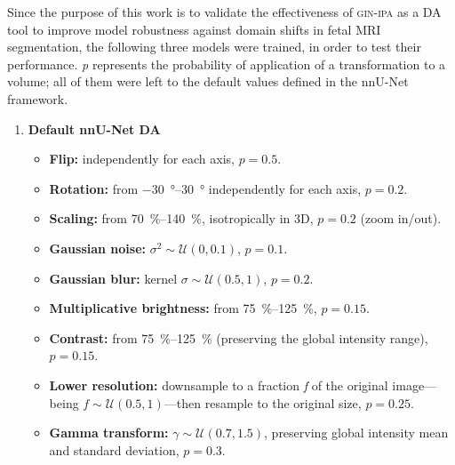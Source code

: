 Since the purpose of this work is to validate the effectiveness of \textsc{gin-ipa} as a DA tool to improve model robustness against domain shifts in fetal MRI segmentation, the following three models were trained, in order to test their performance. \textit{p} represents the probability of application of a transformation to a volume; all of them were left to the default values defined in the nnU-Net framework.
\begin{enumerate}

    \item \textbf{Default nnU-Net DA}
    \begin{itemize}
        \item \textbf{Flip:} independently for each axis, $p=0.5$.
        \item \textbf{Rotation:} from \qtyrange{-30}{30}{\degree} independently for each axis, $p=0.2$.
        \item \textbf{Scaling:} from \qtyrange{70}{140}{\percent}, isotropically in 3D, $p=0.2$ (zoom in/out).
        \item \textbf{Gaussian noise:} $\sigma^2 \sim \mathcal{U}(0, 0.1)$, $p=0.1$.
        \item \textbf{Gaussian blur:} kernel $\sigma \sim \mathcal{U}(0.5, 1)$, $p=0.2$.
        \item \textbf{Multiplicative brightness:} from \qtyrange{75}{125}{\percent}, $p=0.15$.
        \item \textbf{Contrast:} from \qtyrange{75}{125}{\percent} (preserving the global intensity range), $p=0.15$.
        \item \textbf{Lower resolution:} downsample to a fraction \textit{f} of the original image---being $f \sim \mathcal{U}(0.5, 1)$---then resample to the original size, $p=0.25$.
        \item \textbf{Gamma transform:} $\gamma \sim \mathcal{U}(0.7, 1.5)$, preserving global intensity mean and standard deviation, $p=0.3$.
    \end{itemize}


\end{enumerate}
